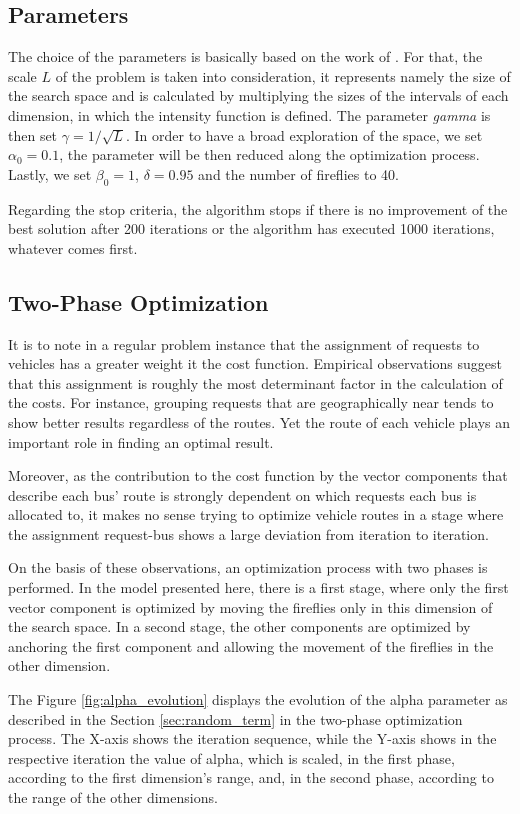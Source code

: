 \documentclass[tuberlin,cic,tc,openright,english,noabntcite,oneside]{iiufrgs}
\begin{document}
\subsection{Parameters}
The choice of the parameters is basically based on the work of \textcite[p. 37-38]{yang_firefly_2013}. For that, the scale $L$ of the problem is taken into consideration, it represents namely the size of the search space and is calculated by multiplying the sizes of the intervals of each dimension, in which the intensity function is defined. The parameter \emph{gamma} is then set $\gamma = 1/\sqrt{L}$. In order to have a broad exploration of the space, we set $\alpha_0 = 0.1$, the parameter will be then reduced along the optimization process. Lastly, we set $\beta_0 = 1$, $\delta = 0.95$ and the number of fireflies to 40.

Regarding the stop criteria, the algorithm stops if there is no improvement of the best solution after 200 iterations or the algorithm has executed 1000 iterations, whatever comes first.

\subsection{Two-Phase Optimization}
It is to note in a regular problem instance that the assignment of requests to vehicles has a greater weight it the cost function. Empirical observations suggest that this assignment is roughly the most determinant factor in the calculation of the costs. For instance, grouping requests that are geographically near tends to show better results regardless of the routes. Yet the route of each vehicle plays an important role in finding an optimal result.

Moreover, as the contribution to the cost function by the vector components that describe each bus' route is strongly dependent on which requests each bus is allocated to, it makes no sense trying to optimize vehicle routes in a stage where the assignment request-bus shows a large deviation from iteration to iteration.

On the basis of these observations, an optimization process with two phases is performed. In the model presented here, there is a first stage, where only the first vector component is optimized by moving the fireflies only in this dimension of the search space. In a second stage, the other components are optimized by anchoring the first component and allowing the movement of the fireflies in the other dimension.

The Figure \ref{fig:alpha_evolution} displays the evolution of the alpha parameter as described in the Section \ref{sec:random_term} in the two-phase optimization process. The X-axis shows the iteration sequence, while the Y-axis shows in the respective iteration the value of alpha, which is scaled, in the first phase, according to the first dimension's range, and, in the second phase, according to the range of the other dimensions.
\end{document}
